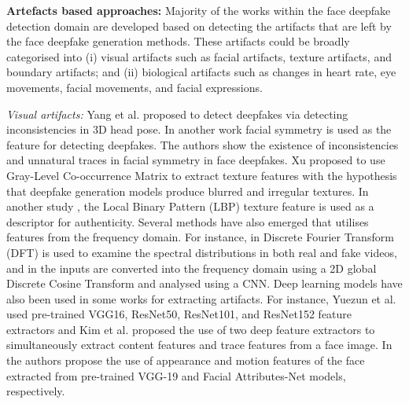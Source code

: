\noindent\textbf{Artefacts based approaches:} Majority of the works within the face deepfake detection domain are developed based on detecting the artifacts that are left by the face deepfake generation methods. These artifacts could be broadly categorised into (i) visual artifacts such as facial artifacts, texture artifacts, and boundary artifacts; and (ii) biological artifacts such as changes in heart rate, eye movements, facial movements, and facial expressions.

\noindent\textit{Visual artifacts:} Yang et al. \cite{yang2019exposing} proposed to detect deepfakes via detecting inconsistencies in 3D head pose. In another work \cite{li2021exploiting} facial symmetry is used as the feature for detecting deepfakes. The authors show the existence of inconsistencies and unnatural traces in facial symmetry in face deepfakes. Xu \cite{xu2021deepfake} proposed to use Gray-Level Co-occurrence Matrix to extract texture features with the hypothesis that deepfake generation models produce blurred and irregular textures. In another study \cite{kingra2022lbpnet}, the Local Binary Pattern (LBP) texture feature is used as a descriptor for authenticity. Several methods have also emerged that utilises features from the frequency domain. For instance, in \cite{durall2019unmasking, liu2021spatial} Discrete Fourier Transform (DFT) is used to examine the spectral distributions in both real and fake videos, and in \cite{kohli2021detecting} the inputs are converted into the frequency domain using a 2D global Discrete Cosine Transform and analysed using a CNN. Deep learning models have also been used in some works for extracting artifacts. For instance, Yuezun et al. \cite{li2018exposing} used pre-trained  VGG16, ResNet50, ResNet101, and ResNet152 feature extractors and Kim et al. \cite{kim2021exposing} proposed the use of two deep feature extractors to simultaneously extract content features and trace features from a face image. In \cite{agarwal2020detecting} the authors propose the use of appearance and motion features of the face extracted from pre-trained VGG-19 and Facial Attributes-Net \cite{wiles2018self} models, respectively.

